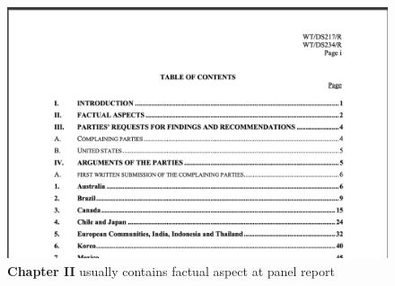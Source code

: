 \begin{figure}[h]
    \centering
    \includegraphics[scale=0.28]{Data/pngs/panel_report_toc.png}
    \caption{{\bf Chapter II} usually contains factual aspect at panel report}
\end{figure}

